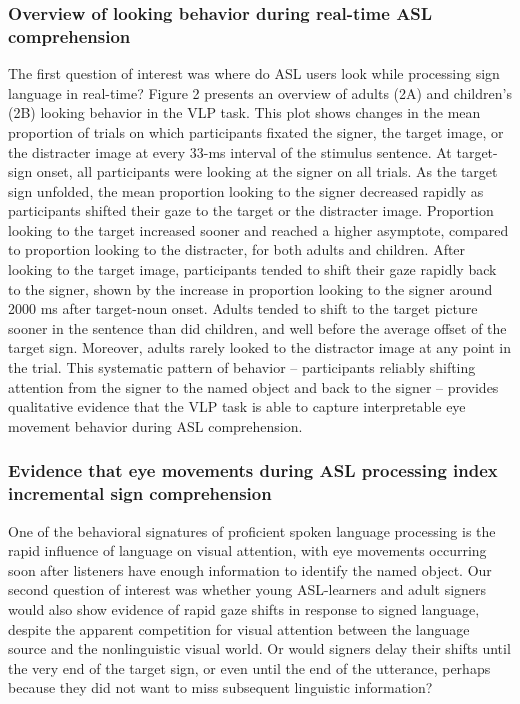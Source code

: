 \documentclass[oneside]{report}
\begin{document}
\subsubsection{Overview of looking behavior during real-time ASL
comprehension}\label{overview-of-looking-behavior-during-real-time-asl-comprehension}

The first question of interest was where do ASL users look while
processing sign language in real-time? Figure 2 presents an overview of
adults (2A) and children's (2B) looking behavior in the VLP task. This
plot shows changes in the mean proportion of trials on which
participants fixated the signer, the target image, or the distracter
image at every 33-ms interval of the stimulus sentence. At target-sign
onset, all participants were looking at the signer on all trials. As the
target sign unfolded, the mean proportion looking to the signer
decreased rapidly as participants shifted their gaze to the target or
the distracter image. Proportion looking to the target increased sooner
and reached a higher asymptote, compared to proportion looking to the
distracter, for both adults and children. After looking to the target
image, participants tended to shift their gaze rapidly back to the
signer, shown by the increase in proportion looking to the signer around
2000 ms after target-noun onset. Adults tended to shift to the target
picture sooner in the sentence than did children, and well before the
average offset of the target sign. Moreover, adults rarely looked to the
distractor image at any point in the trial. This systematic pattern of
behavior -- participants reliably shifting attention from the signer to
the named object and back to the signer -- provides qualitative evidence
that the VLP task is able to capture interpretable eye movement behavior
during ASL comprehension.

\subsubsection{Evidence that eye movements during ASL processing index
incremental sign
comprehension}\label{evidence-that-eye-movements-during-asl-processing-index-incremental-sign-comprehension}

One of the behavioral signatures of proficient spoken language
processing is the rapid influence of language on visual attention, with
eye movements occurring soon after listeners have enough information to
identify the named object. Our second question of interest was whether
young ASL-learners and adult signers would also show evidence of rapid
gaze shifts in response to signed language, despite the apparent
competition for visual attention between the language source and the
nonlinguistic visual world. Or would signers delay their shifts until
the very end of the target sign, or even until the end of the utterance,
perhaps because they did not want to miss subsequent linguistic
information?
\end{document}
